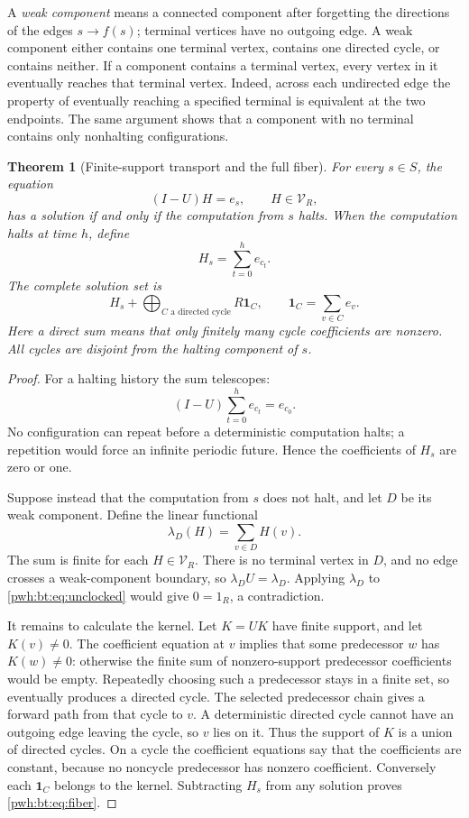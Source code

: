 \documentclass[11pt,letterpaper]{article}
\numberwithin{equation}{section}
\newtheorem{theorem}{Theorem}[section]
\theoremstyle{definition}
\newcommand{\one}{\mathbf 1}
\newcommand{\V}{\mathcal V}
\begin{document}
A \emph{weak component} means a connected component after forgetting the
directions of the edges $s\to f(s)$; terminal vertices have no outgoing
edge. A weak component either contains one terminal vertex, contains one
directed cycle, or contains neither. If a component contains a terminal
vertex, every vertex in it eventually reaches that terminal vertex.
Indeed, across each undirected edge the property of eventually reaching
a specified terminal is equivalent at the two endpoints. The same
argument shows that a component with no terminal contains only
nonhalting configurations.

\begin{theorem}[Finite-support transport and the full fiber]\label{pwh:bt:thm:unclocked}
For every $s\in S$, the equation
\begin{equation}\label{pwh:bt:eq:unclocked}
 (I-U)H=e_s,\qquad H\in\V_R,
\end{equation}
has a solution if and only if the computation from $s$ halts.
When the computation halts at time $h$, define
\[
 H_s=\sum_{t=0}^{h}e_{c_t}.
\]
The complete solution set is
\begin{equation}\label{pwh:bt:eq:fiber}
 H_s+\bigoplus_{C\text{ a directed cycle}}R\one_C,
 \qquad \one_C=\sum_{v\in C}e_v.
\end{equation}
Here a direct sum means that only finitely many cycle coefficients are
nonzero. All cycles are disjoint from the halting component of $s$.
\end{theorem}

\begin{proof}
For a halting history the sum telescopes:
\[
 (I-U)\sum_{t=0}^{h}e_{c_t}=e_{c_0}.
\]
No configuration can repeat before a deterministic computation halts;
a repetition would force an infinite periodic future. Hence the
coefficients of $H_s$ are zero or one.

Suppose instead that the computation from $s$ does not halt, and let $D$
be its weak component. Define the linear functional
\[
 \lambda_D(H)=\sum_{v\in D}H(v).
\]
The sum is finite for each $H\in\V_R$. There is no terminal vertex in $D$,
and no edge crosses a weak-component boundary, so
$\lambda_D U=\lambda_D$. Applying $\lambda_D$ to
\eqref{pwh:bt:eq:unclocked} would give $0=1_R$, a contradiction.

It remains to calculate the kernel. Let $K=UK$ have finite support, and
let $K(v)\ne0$. The coefficient equation at $v$ implies that some
predecessor $w$ has $K(w)\ne0$: otherwise the finite sum of nonzero-support
predecessor coefficients would be empty. Repeatedly choosing such a
predecessor stays in a finite set, so eventually produces a directed
cycle. The selected predecessor chain gives a forward path from that
cycle to $v$. A deterministic directed cycle cannot have an outgoing
edge leaving the cycle, so $v$ lies on it. Thus the support of $K$ is a
union of directed cycles. On a cycle the coefficient equations say that
the coefficients are constant, because no noncycle predecessor has
nonzero coefficient. Conversely each $\one_C$ belongs to the kernel.
Subtracting $H_s$ from any solution proves \eqref{pwh:bt:eq:fiber}.
\end{proof}
\end{document}

